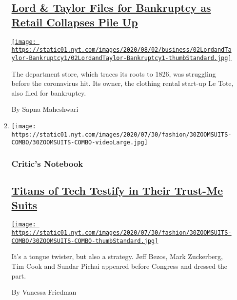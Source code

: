 \begin{enumerate}
\begin{enumerate}
    \hypertarget{lord--taylor-files-for-bankruptcy-as-retail-collapses-pile-up}{%
    \subsection{\texorpdfstring{\href{/2020/08/02/business/Lord-and-Taylor-Bankruptcy.html}{Lord
    \& Taylor Files for Bankruptcy as Retail Collapses Pile
    Up}}{Lord \& Taylor Files for Bankruptcy as Retail Collapses Pile Up}}\label{lord--taylor-files-for-bankruptcy-as-retail-collapses-pile-up}}

    \href{/2020/08/02/business/Lord-and-Taylor-Bankruptcy.html}{\texttt{[image: https://static01.nyt.com/images/2020/08/02/business/02LordandTaylor-Bankruptcy1/02LordandTaylor-Bankruptcy1-thumbStandard.jpg]}}

    The department store, which traces its roots to 1826, was struggling
    before the coronavirus hit. Its owner, the clothing rental start-up
    Le Tote, also filed for bankruptcy.

    By Sapna Maheshwari
  \item
    \texttt{[image: https://static01.nyt.com/images/2020/07/30/fashion/30ZOOMSUITS-COMBO/30ZOOMSUITS-COMBO-videoLarge.jpg]}

    \hypertarget{critics-notebook}{%
    \subsubsection{Critic's Notebook}\label{critics-notebook}}

    \hypertarget{titans-of-tech-testify-in-their-trust-me-suits}{%
    \subsection{\texorpdfstring{\href{/2020/07/29/style/Bezos-zuckerberg-cook-pichai-testimony-suits.html}{Titans
    of Tech Testify in Their Trust-Me
    Suits}}{Titans of Tech Testify in Their Trust-Me Suits}}\label{titans-of-tech-testify-in-their-trust-me-suits}}

    \href{/2020/07/29/style/Bezos-zuckerberg-cook-pichai-testimony-suits.html}{\texttt{[image: https://static01.nyt.com/images/2020/07/30/fashion/30ZOOMSUITS-COMBO/30ZOOMSUITS-COMBO-thumbStandard.jpg]}}

    It's a tongue twister, but also a strategy. Jeff Bezos, Mark
    Zuckerberg, Tim Cook and Sundar Pichai appeared before Congress and
    dressed the part.

    By Vanessa Friedman
  \end{enumerate}
\end{enumerate}


